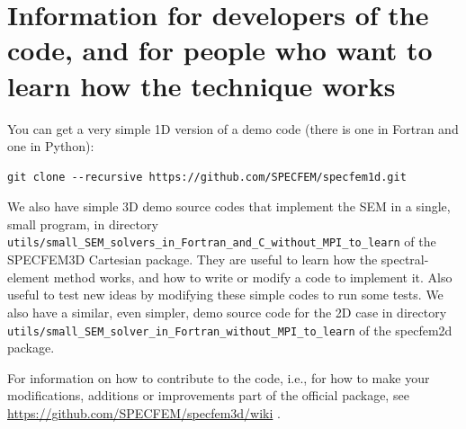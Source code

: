 
\chapter{Information for developers of the code, and for people who want to learn how the technique works}\label{cha:developers}


You can get a very simple 1D version of a demo code (there is one in Fortran and one in Python):
\begin{verbatim}
git clone --recursive https://github.com/SPECFEM/specfem1d.git
\end{verbatim}

\noindent
We also have simple 3D demo source codes that implement the SEM in a single, small program, in directory\newline
\texttt{utils/small\_SEM\_solvers\_in\_Fortran\_and\_C\_without\_MPI\_to\_learn} of the SPECFEM3D Cartesian package.
They are useful to learn how the spectral-element method works, and how to write or modify a code to implement it.
Also useful to test new ideas by modifying these simple codes to run some tests.
We also have a similar, even simpler, demo source code for the 2D case in directory\newline
\texttt{utils/small\_SEM\_solver\_in\_Fortran\_without\_MPI\_to\_learn} of the specfem2d package.\newline


\noindent
For information on how to contribute to the code, i.e., for how to make your modifications, additions or improvements part of the
official package, see \url{https://github.com/SPECFEM/specfem3d/wiki} .

